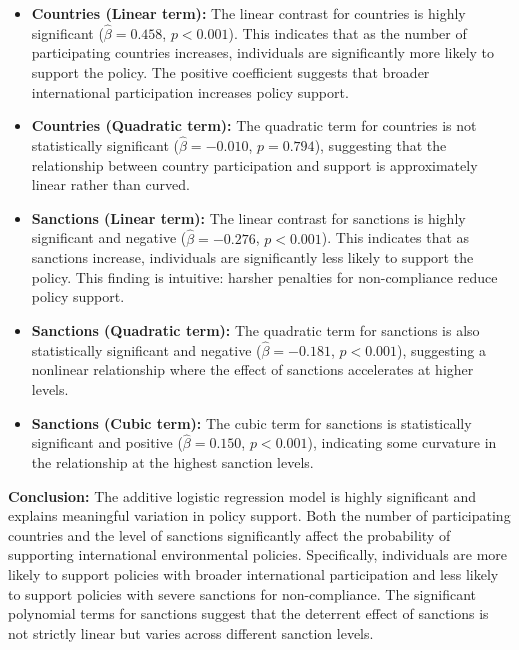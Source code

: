 \documentclass[12pt,letterpaper]{article}
\begin{document}
\begin{itemize}
	\item \textbf{Countries (Linear term):} The linear contrast for countries is highly significant ($\hat{\beta} = 0.458$, $p < 0.001$). This indicates that as the number of participating countries increases, individuals are significantly more likely to support the policy. The positive coefficient suggests that broader international participation increases policy support.
	
	\item \textbf{Countries (Quadratic term):} The quadratic term for countries is not statistically significant ($\hat{\beta} = -0.010$, $p = 0.794$), suggesting that the relationship between country participation and support is approximately linear rather than curved.
	
	\item \textbf{Sanctions (Linear term):} The linear contrast for sanctions is highly significant and negative ($\hat{\beta} = -0.276$, $p < 0.001$). This indicates that as sanctions increase, individuals are significantly less likely to support the policy. This finding is intuitive: harsher penalties for non-compliance reduce policy support.
	
	\item \textbf{Sanctions (Quadratic term):} The quadratic term for sanctions is also statistically significant and negative ($\hat{\beta} = -0.181$, $p < 0.001$), suggesting a nonlinear relationship where the effect of sanctions accelerates at higher levels.
	
	\item \textbf{Sanctions (Cubic term):} The cubic term for sanctions is statistically significant and positive ($\hat{\beta} = 0.150$, $p < 0.001$), indicating some curvature in the relationship at the highest sanction levels.
\end{itemize}

\noindent\textbf{Conclusion:} The additive logistic regression model is highly significant and explains meaningful variation in policy support. Both the number of participating countries and the level of sanctions significantly affect the probability of supporting international environmental policies. Specifically, individuals are more likely to support policies with broader international participation and less likely to support policies with severe sanctions for non-compliance. The significant polynomial terms for sanctions suggest that the deterrent effect of sanctions is not strictly linear but varies across different sanction levels.
\end{document}
